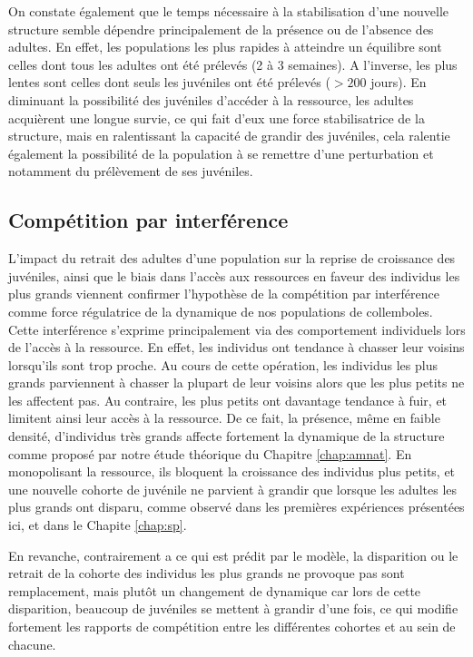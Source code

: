 On constate également que le temps nécessaire à la stabilisation d'une nouvelle
structure semble dépendre principalement de la présence ou de l'absence des
adultes. En effet, les populations les plus rapides à atteindre un équilibre
sont celles dont tous les adultes ont été prélevés (2 à 3 semaines).
A l'inverse, les plus lentes sont celles dont seuls les juvéniles ont été
prélevés ($>200$ jours). En diminuant la possibilité des juvéniles d'accéder à
la ressource, les adultes acquièrent une longue survie, ce qui fait d'eux une
force stabilisatrice de la structure, mais en ralentissant la capacité de
grandir des juvéniles, cela ralentie également la possibilité de la population à
se remettre d'une perturbation et notamment du prélèvement de ses juvéniles.

\subsection{Compétition par interférence}

L'impact du retrait des adultes d'une population sur la reprise de croissance
des juvéniles, ainsi que le biais dans l'accès aux ressources en faveur des
individus les plus grands viennent confirmer l'hypothèse de la compétition par
interférence comme force régulatrice de la dynamique de nos populations de
collemboles. Cette interférence s'exprime principalement via des comportement
individuels lors de l'accès à la ressource. En effet, les individus ont tendance
à chasser leur voisins lorsqu'ils sont trop proche. Au cours de cette opération,
les individus les plus grands parviennent à chasser la plupart de leur voisins
alors que les plus petits ne les affectent pas. Au contraire, les plus petits
ont davantage tendance à fuir, et limitent ainsi leur accès à la ressource. De
ce fait, la présence, même en faible densité, d'individus très grands affecte
fortement la dynamique de la structure comme proposé par notre étude théorique
du Chapitre \ref{chap:amnat}. En monopolisant la ressource, ils bloquent la
croissance des individus plus petits, et une nouvelle cohorte de juvénile ne
parvient à grandir que lorsque les adultes les plus grands ont disparu, comme
observé dans les premières expériences présentées ici, et dans le Chapite
\ref{chap:sp}.

En revanche, contrairement a ce qui est prédit par le modèle, la disparition
ou le retrait de la cohorte des individus les plus grands ne provoque pas sont
remplacement, mais plutôt un changement de dynamique car lors de cette
disparition, beaucoup de juvéniles se mettent à grandir d'une fois, ce qui
modifie fortement les rapports de compétition entre les différentes cohortes et
au sein de chacune.


